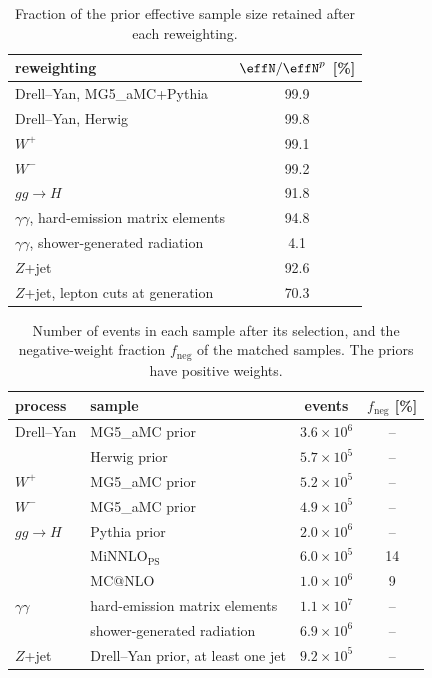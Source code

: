 \begin{table}[t]
\centering
\tabsetup
\begin{tabular}{@{}l S[table-format=2.1]@{}}
\toprule
reweighting & {$\effN/\effN^{p}$ [\%]} \\
\midrule
Drell--Yan, MG5\_aMC+Pythia & 99.9 \\
Drell--Yan, Herwig & 99.8 \\
$W^{+}$ & 99.1 \\
$W^{-}$ & 99.2 \\
$gg\to H$ & 91.8 \\
$\gamma\gamma$, hard-emission matrix elements & 94.8 \\
$\gamma\gamma$, shower-generated radiation & 4.1 \\
$Z$+jet & 92.6 \\
$Z$+jet, lepton cuts at generation & 70.3 \\
\bottomrule
\end{tabular}
\caption{Fraction of the prior effective sample size retained after each reweighting.}
\label{tab:cost}
\end{table}

\begin{table}[t]
\centering
\tabsetup
\begin{tabular}{@{}l l c S[table-format=2.1]@{}}
\toprule
process & sample & events & {$f_\mathrm{neg}$ [\%]} \\
\midrule
Drell--Yan & MG5\_aMC prior & $3.6\times10^{6}$ & {--} \\
 & Herwig prior & $5.7\times10^{5}$ & {--} \\
$W^{+}$ & MG5\_aMC prior & $5.2\times10^{5}$ & {--} \\
$W^{-}$ & MG5\_aMC prior & $4.9\times10^{5}$ & {--} \\
\addlinespace[3pt]
$gg\to H$ & Pythia prior & $2.0\times10^{6}$ & {--} \\
 & MiNNLO$_\mathrm{PS}$ & $6.0\times10^{5}$ & 14 \\
 & MC@NLO & $1.0\times10^{6}$ & 9 \\
\addlinespace[3pt]
$\gamma\gamma$ & hard-emission matrix elements & $1.1\times10^{7}$ & {--} \\
 & shower-generated radiation & $6.9\times10^{6}$ & {--} \\
\addlinespace[3pt]
$Z$+jet & Drell--Yan prior, at least one jet & $9.2\times10^{5}$ & {--} \\
\bottomrule
\end{tabular}
\caption{Number of events in each sample after its selection, and the negative-weight fraction $f_\mathrm{neg}$ of the matched samples. The priors have positive weights.}
\label{tab:samples}
\end{table}
